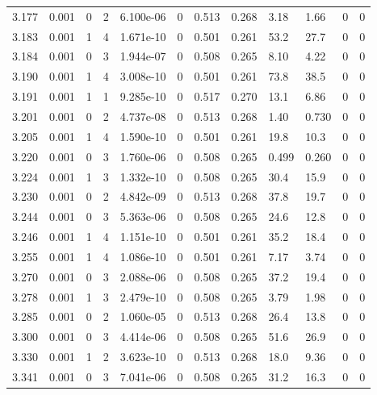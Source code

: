 \documentclass[preview]{standalone}
\begin{document}
{{{{{{{{\begin{tabular}{L{1.2cm}C{1.2cm} C{0.3cm}C{0.5cm} C{1.4cm}C{1.4cm} C{1.4cm}C{1.4cm} C{1.6cm}C{1.6cm} C{1.6cm}C{1.6cm}}
  3.177  &  0.001  & 0     &  2 &  6.100e-06  & 0  &  0.513&   0.268& 3.18 & 1.66   &  0 & 0  \\ 
  3.183  &  0.001  & 1     &  4 &  1.671e-10  & 0  &  0.501&   0.261& 53.2 & 27.7   &  0 & 0  \\ 
  3.184  &  0.001  & 0     &  3 &  1.944e-07  & 0  &  0.508&   0.265& 8.10 & 4.22   &  0 & 0  \\ 
  3.190  &  0.001  & 1     &  4 &  3.008e-10  & 0  &  0.501&   0.261& 73.8 & 38.5   &  0 & 0  \\ 
  3.191  &  0.001  & 1     &  1 &  9.285e-10  & 0  &  0.517&   0.270& 13.1 & 6.86   &  0 & 0  \\ 
  3.201  &  0.001  & 0     &  2 &  4.737e-08  & 0  &  0.513&   0.268& 1.40 & 0.730   &  0 & 0  \\ 
  3.205  &  0.001  & 1     &  4 &  1.590e-10  & 0  &  0.501&   0.261& 19.8 & 10.3   &  0 & 0  \\ 
  3.220  &  0.001  & 0     &  3 &  1.760e-06  & 0  &  0.508&   0.265& 0.499 & 0.260   &  0 & 0  \\ 
  3.224  &  0.001  & 1     &  3 &  1.332e-10  & 0  &  0.508&   0.265& 30.4 & 15.9   &  0 & 0  \\ 
  3.230  &  0.001  & 0     &  2 &  4.842e-09  & 0  &  0.513&   0.268& 37.8 & 19.7   &  0 & 0  \\ 
  3.244  &  0.001  & 0     &  3 &  5.363e-06  & 0  &  0.508&   0.265& 24.6 & 12.8   &  0 & 0  \\ 
  3.246  &  0.001  & 1     &  4 &  1.151e-10  & 0  &  0.501&   0.261& 35.2 & 18.4   &  0 & 0  \\ 
  3.255  &  0.001  & 1     &  4 &  1.086e-10  & 0  &  0.501&   0.261& 7.17 & 3.74   &  0 & 0  \\ 
  3.270  &  0.001  & 0     &  3 &  2.088e-06  & 0  &  0.508&   0.265& 37.2 & 19.4   &  0 & 0  \\ 
  3.278  &  0.001  & 1     &  3 &  2.479e-10  & 0  &  0.508&   0.265& 3.79 & 1.98   &  0 & 0  \\ 
  3.285  &  0.001  & 0     &  2 &  1.060e-05  & 0  &  0.513&   0.268& 26.4 & 13.8   &  0 & 0  \\ 
  3.300  &  0.001  & 0     &  3 &  4.414e-06  & 0  &  0.508&   0.265& 51.6 & 26.9   &  0 & 0  \\ 
  3.330  &  0.001  & 1     &  2 &  3.623e-10  & 0  &  0.513&   0.268& 18.0 & 9.36   &  0 & 0  \\ 
  3.341  &  0.001  & 0     &  3 &  7.041e-06  & 0  &  0.508&   0.265& 31.2 & 16.3   &  0 & 0  \\ 

\end{tabular}}}}}}}}}
\end{document}
